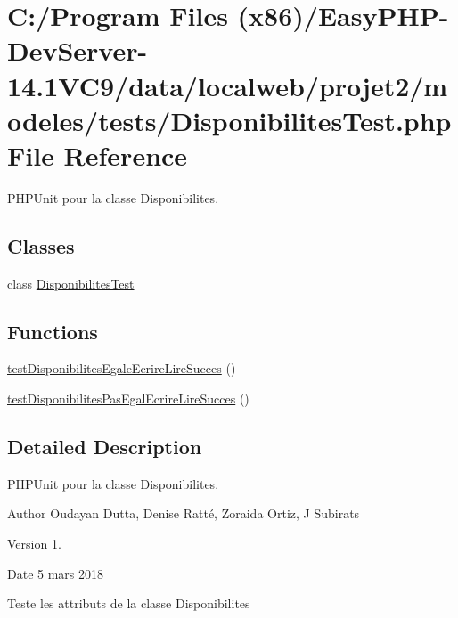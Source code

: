 \hypertarget{_disponibilites_test_8php}{}\section{C\+:/\+Program Files (x86)/\+Easy\+P\+H\+P-\/\+Dev\+Server-\/14.1\+V\+C9/data/localweb/projet2/modeles/tests/\+Disponibilites\+Test.php File Reference}
\label{_disponibilites_test_8php}


P\+H\+P\+Unit pour la classe Disponibilites.  


\subsection*{Classes}
\begin{DoxyCompactItemize}
\item 
class \hyperlink{class_disponibilites_test}{Disponibilites\+Test}
\end{DoxyCompactItemize}
\subsection*{Functions}
\begin{DoxyCompactItemize}
\item 
\hyperlink{_disponibilites_test_8php_accbf3d4614e28a843c699d4c7c9f867c}{test\+Disponibilites\+Egale\+Ecrire\+Lire\+Succes} ()
\item 
\hyperlink{_disponibilites_test_8php_ac1bc1493d900e5f0985b18d8c8d0b62a}{test\+Disponibilites\+Pas\+Egal\+Ecrire\+Lire\+Succes} ()
\end{DoxyCompactItemize}


\subsection{Detailed Description}
P\+H\+P\+Unit pour la classe Disponibilites. 

\begin{DoxyAuthor}{Author}
Oudayan Dutta, Denise Ratté, Zoraida Ortiz, J Subirats 
\end{DoxyAuthor}
\begin{DoxyVersion}{Version}
1. 
\end{DoxyVersion}
\begin{DoxyDate}{Date}
5 mars 2018
\end{DoxyDate}
Teste les attributs de la classe Disponibilites 


